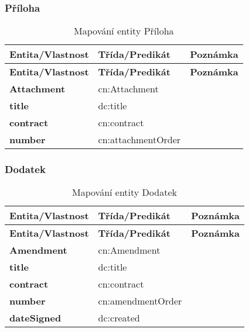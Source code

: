 \subsubsection*{Příloha}

\begin{center}
\begin{longtable}{lll}
\label{grid_mlmmh} \\
\multicolumn{1}{l}{\textbf{Entita/Vlastnost}} & 
\multicolumn{1}{l}{\textbf{Třída/Predikát}} & 
\multicolumn{1}{l}{\textbf{Poznámka}} \\ \hline 
\endfirsthead
\multicolumn{1}{l}{\textbf{Entita/Vlastnost}} & 
\multicolumn{1}{l}{\textbf{Třída/Predikát}} & 
\multicolumn{1}{l}{\textbf{Poznámka}} \\ \hline 
\hline
\endhead
\endfoot
\caption{Mapování entity Příloha}
\endlastfoot
\textbf{Attachment} & cn:Attachment \\
\textbf{title} & dc:title \\
\textbf{contract} & cn:contract \\
\textbf{number} & cn:attachmentOrder \\
\end{longtable}
\end{center}

\subsubsection*{Dodatek}

\begin{center}
\begin{longtable}{lll}
\label{grid_mlmmh} \\
\multicolumn{1}{l}{\textbf{Entita/Vlastnost}} & 
\multicolumn{1}{l}{\textbf{Třída/Predikát}} & 
\multicolumn{1}{l}{\textbf{Poznámka}} \\ \hline 
\endfirsthead
\multicolumn{1}{l}{\textbf{Entita/Vlastnost}} & 
\multicolumn{1}{l}{\textbf{Třída/Predikát}} & 
\multicolumn{1}{l}{\textbf{Poznámka}} \\ \hline 
\hline
\endhead
\endfoot
\caption{Mapování entity Dodatek}
\endlastfoot
\textbf{Amendment} & cn:Amendment \\
\textbf{title} & dc:title \\
\textbf{contract} & cn:contract \\
\textbf{number} & cn:amendmentOrder \\
\textbf{dateSigned} & dc:created \\
\end{longtable}
\end{center}

